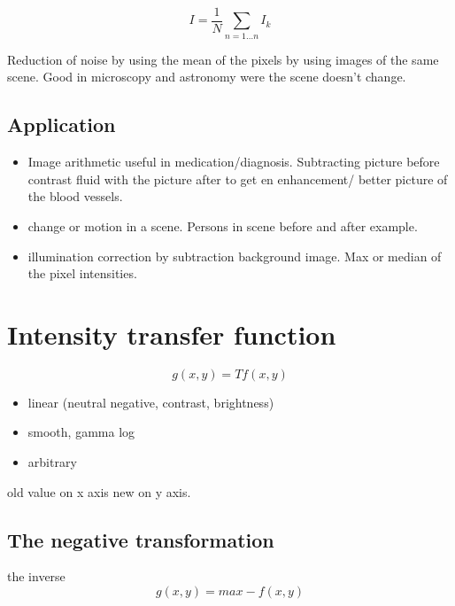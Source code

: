 \begin{equation}
I =  \frac{1} {N} \sum_{n=1 \ldots n }I_k
\end{equation}

Reduction of noise by using the mean of the pixels by using images of the same scene. Good in microscopy and astronomy were the scene doesn't change. 

\subsection*{Application}

\begin{itemize}
    \item Image arithmetic useful in medication/diagnosis. Subtracting picture before contrast fluid with the picture after to get en enhancement/ better picture of the blood vessels. 
    \item change or motion in a scene. Persons in scene before and after example. 
    \item illumination correction by subtraction background image. Max or median of the pixel intensities. 
\end{itemize}


\section{Intensity transfer function}

\begin{equation}
g(x,y) = Tf(x,y)
\end{equation}

\begin{itemize}
    \item linear (neutral negative, contrast, brightness)
    \item smooth, gamma log
    \item arbitrary
\end{itemize}

old value on x axis new on y axis.

\subsection*{The negative transformation}
the inverse 
\begin{equation}
g(x,y) = max - f(x,y)
\end{equation}



